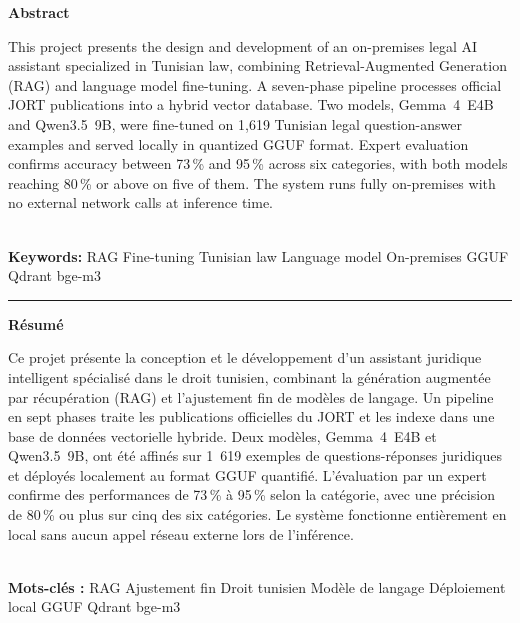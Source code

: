 \thispagestyle{empty}

\vfill

\begin{center}

{\bfseries Abstract}\\[0.25cm]
\begin{minipage}{0.85\textwidth}
\centering
This project presents the design and development of an on-premises legal \ac{AI} assistant
specialized in Tunisian law, combining Retrieval-Augmented Generation (\ac{RAG}) and
language model fine-tuning. A seven-phase pipeline processes official \ac{JORT}
publications into a hybrid vector database. Two models, Gemma~4~E4B and Qwen3.5~9B,
were fine-tuned on 1,619 Tunisian legal question-answer examples and served locally
in quantized \ac{GGUF} format. Expert evaluation confirms accuracy between 73\,\%
and 95\,\% across six categories, with both models reaching 80\,\% or above on five
of them. The system runs fully on-premises with no external network calls at inference time.
\end{minipage}\\[0.15cm]
{\bfseries Keywords:} RAG \textbullet{} Fine-tuning \textbullet{} Tunisian law
\textbullet{} Language model \textbullet{} On-premises \textbullet{} GGUF \textbullet{} Qdrant \textbullet{} bge-m3

\vspace{0.12cm}
\rule{0.6\linewidth}{0.4pt}
\vspace{0.12cm}

{\bfseries Résumé}\\[0.25cm]
\begin{minipage}{0.85\textwidth}
\centering
Ce projet présente la conception et le développement d'un assistant juridique intelligent
spécialisé dans le droit tunisien, combinant la génération augmentée par récupération
(\ac{RAG}) et l'ajustement fin de modèles de langage. Un pipeline en sept phases traite
les publications officielles du \ac{JORT} et les indexe dans une base de données vectorielle
hybride. Deux modèles, Gemma~4~E4B et Qwen3.5~9B, ont été affinés sur 1~619 exemples
de questions-réponses juridiques et déployés localement au format \ac{GGUF} quantifié.
L'évaluation par un expert confirme des performances de 73\,\% à 95\,\% selon la catégorie,
avec une précision de 80\,\% ou plus sur cinq des six catégories. Le système fonctionne
entièrement en local sans aucun appel réseau externe lors de l'inférence.
\end{minipage}\\[0.15cm]
{\bfseries Mots-clés :} RAG \textbullet{} Ajustement fin \textbullet{} Droit tunisien
\textbullet{} Modèle de langage \textbullet{} Déploiement local \textbullet{} GGUF \textbullet{} Qdrant \textbullet{} bge-m3


\end{center}
